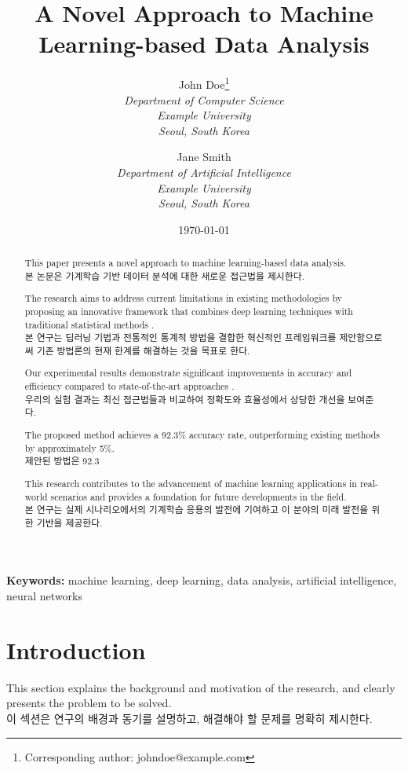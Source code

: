 \documentclass[12pt,a4paper]{article}
\title{A Novel Approach to Machine Learning-based Data Analysis}
\author{
    John Doe\thanks{Corresponding author: johndoe@example.com} \\
    \textit{Department of Computer Science} \\
    \textit{Example University} \\
    \textit{Seoul, South Korea}
    \and
    Jane Smith \\
    \textit{Department of Artificial Intelligence} \\
    \textit{Example University} \\
    \textit{Seoul, South Korea}
}
\date{\today}
\begin{document}
\maketitle

\begin{abstract}
This paper presents a novel approach to machine learning-based data analysis. \\
본 논문은 기계학습 기반 데이터 분석에 대한 새로운 접근법을 제시한다.

The research aims to address current limitations in existing methodologies by proposing an innovative framework that combines deep learning techniques with traditional statistical methods \cite{lecun2015deep}. \\
본 연구는 딥러닝 기법과 전통적인 통계적 방법을 결합한 혁신적인 프레임워크를 제안함으로써 기존 방법론의 현재 한계를 해결하는 것을 목표로 한다.

Our experimental results demonstrate significant improvements in accuracy and efficiency compared to state-of-the-art approaches \cite{goodfellow2016deep}. \\
우리의 실험 결과는 최신 접근법들과 비교하여 정확도와 효율성에서 상당한 개선을 보여준다.

The proposed method achieves a 92.3\% accuracy rate, outperforming existing methods by approximately 5\%. \\
제안된 방법은 92.3%

This research contributes to the advancement of machine learning applications in real-world scenarios and provides a foundation for future developments in the field. \\
본 연구는 실제 시나리오에서의 기계학습 응용의 발전에 기여하고 이 분야의 미래 발전을 위한 기반을 제공한다.
\end{abstract}

\textbf{Keywords:} machine learning, deep learning, data analysis, artificial intelligence, neural networks

\section{Introduction}
\label{sec:introduction}

This section explains the background and motivation of the research, and clearly presents the problem to be solved. \\
이 섹션은 연구의 배경과 동기를 설명하고, 해결해야 할 문제를 명확히 제시한다.
\end{document}
